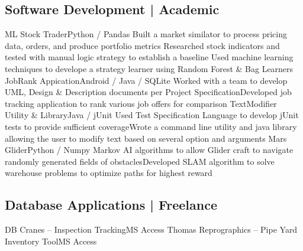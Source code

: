 \subsection{Software Development | Academic}
%
\justifiedsubsection%
{ML Stock Trader}{Python / Pandas}
%
\workitems%
{Built a market similator to process pricing data, orders, and produce portfolio metrics}
{Researched stock indicators and tested with manual logic strategy to establish a baseline}
{Used machine learning techniques to develope a strategy learner using Random Forest \& Bag Learners}
%
\justifiedsubsection%
{JobRank Appication}{Android / Java / SQLite}
%
\workitemstwo%
{Worked with a team to develop UML, Design \& Description documents per Project Specification}{Developed job tracking application to rank various job offers for comparison}
%
\justifiedsubsection%
{TextModifier Utility \& Library}{Java / jUnit}
%
\workitemstwo%
{Used Test Specification Language to develop jUnit tests to provide sufficient coverage}{Wrote a command line utility and java library allowing the user to modify text based on several option and arguments}
%
\justifiedsubsection%
{Mars Glider}{Python / Numpy}
%
\workitemstwo%
{Markov AI algorithms to allow Glider craft to navigate randomly generated fields of obstacles}{Developed SLAM algorithm to solve warehouse problems to optimize paths for highest reward}
%
%
%
\subsection{Database Applications | Freelance}
%
\justifiedsubsection%
{DB Cranes -- Inspection Tracking}{MS Access}
%
\justifiedsubsection%
{Thomas Reprographics -- Pipe Yard Inventory Tool}{MS Access}
